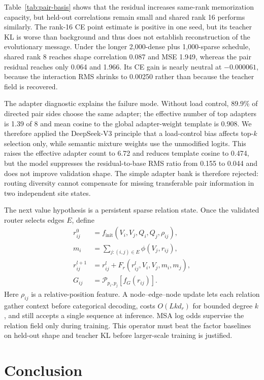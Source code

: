 \documentclass[10pt]{article}
\begin{document}
Table~\ref{tab:pair-basis} shows that the residual increases same-rank memorization capacity,
but held-out correlations remain small and shared rank 16 performs similarly.  The rank-16 CE
point estimate is positive in one seed, but its teacher KL is worse than background and thus
does not establish reconstruction of the evolutionary message.  Under the longer
2,000-dense plus 1,000-sparse schedule, shared rank 8 reaches shape correlation 0.087 and MSE
1.949, whereas the pair residual reaches only 0.064 and 1.966.  Its CE gain is nearly neutral
at $-0.000061$, because the interaction RMS shrinks to 0.00250 rather than because the teacher
field is recovered.

The adapter diagnostic explains the failure mode.  Without load control, 89.9\% of directed
pair sides choose the same adapter; the effective number of top adapters is 1.39 of 8 and mean
cosine to the global adapter-weight template is 0.908.  We therefore applied the
DeepSeek-V3 principle that a load-control bias affects top-$k$ selection only, while semantic
mixture weights use the unmodified logits.  This raises the effective adapter count to 6.72 and
reduces template cosine to 0.474, but the model suppresses the residual-to-base RMS ratio from
0.155 to 0.044 and does not improve validation shape.  The simple adapter bank is therefore
rejected: routing diversity cannot compensate for missing transferable pair information in two
independent site states.

The next value hypothesis is a persistent sparse relation state.  Once the validated router
selects edges $E$, define
\begin{align}
r_{ij}^{0}&=f_{\mathrm{init}}(V_i,V_j,Q_i,Q_j,\rho_{ij}),\\
m_i&=\sum_{j:(i,j)\in E}\phi(V_j,r_{ij}),\\
r_{ij}^{l+1}&=r_{ij}^{l}+F_r(r_{ij}^{l},V_i,V_j,m_i,m_j),\\
G_{ij}&=\mathcal P_{p_i,p_j}[f_G(r_{ij})].
\end{align}
Here $\rho_{ij}$ is a relative-position feature.  A node--edge--node update lets each relation
gather context before categorical decoding, costs $O(Lkd_r)$ for bounded degree $k$, and still
accepts a single sequence at inference.  MSA log odds supervise the relation field only during
training.  This operator must beat the factor baselines on held-out shape and teacher KL before
larger-scale training is justified.

\section{Conclusion}
\end{document}
